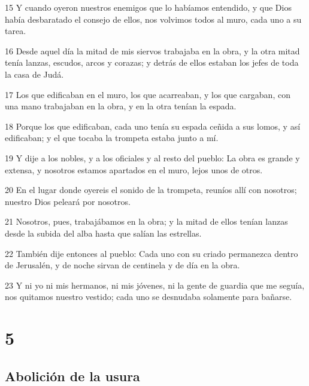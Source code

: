 \par 15 Y cuando oyeron nuestros enemigos que lo habíamos entendido, y que Dios había desbaratado el consejo de ellos, nos volvimos todos al muro, cada uno a su tarea.
\par 16 Desde aquel día la mitad de mis siervos trabajaba en la obra, y la otra mitad tenía lanzas, escudos, arcos y corazas; y detrás de ellos estaban los jefes de toda la casa de Judá.
\par 17 Los que edificaban en el muro, los que acarreaban, y los que cargaban, con una mano trabajaban en la obra, y en la otra tenían la espada.
\par 18 Porque los que edificaban, cada uno tenía su espada ceñida a sus lomos, y así edificaban; y el que tocaba la trompeta estaba junto a mí.
\par 19 Y dije a los nobles, y a los oficiales y al resto del pueblo: La obra es grande y extensa, y nosotros estamos apartados en el muro, lejos unos de otros.
\par 20 En el lugar donde oyereis el sonido de la trompeta, reuníos allí con nosotros; nuestro Dios peleará por nosotros.
\par 21 Nosotros, pues, trabajábamos en la obra; y la mitad de ellos tenían lanzas desde la subida del alba hasta que salían las estrellas.
\par 22 También dije entonces al pueblo: Cada uno con su criado permanezca dentro de Jerusalén, y de noche sirvan de centinela y de día en la obra.
\par 23 Y ni yo ni mis hermanos, ni mis jóvenes, ni la gente de guardia que me seguía, nos quitamos nuestro vestido; cada uno se desnudaba solamente para bañarse.

\chapter{5}

\section*{Abolición de la usura}

